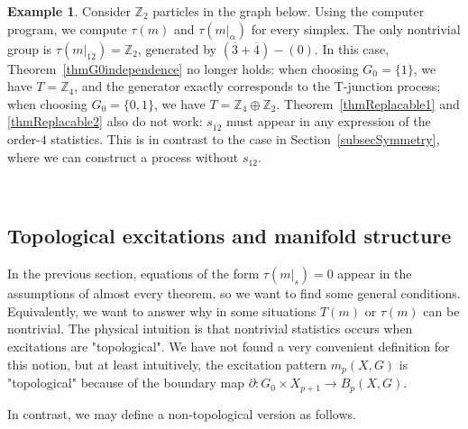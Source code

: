 \documentclass[reprint, amsmath, amssymb, showpacs, floatfix, longbibliography, aps, twocolumn, superscriptaddress, nofootinbib]{revtex4-2}
\newcommand{\ZZ}{{\mathbb Z}}
\theoremstyle{definition}
\newtheorem{example}{Example}[section]
\begin{document}
\begin{example}\label{expNotManifold}
	Consider $\ZZ_2$ particles in the graph below. Using the computer program, we compute $\tau(m)$ and $\tau(m|_\alpha)$ for every simplex. The only nontrivial group is $\tau(m|_{\overline{12}})=\ZZ_2$, generated by $(\overline{3}+\overline{4})-(0)$.  In this case, Theorem~\ref{thmG0independence} no longer holds: when choosing $G_0=\{1\}$, we have $T=\ZZ_4$, and the generator exactly corresponds to the T-junction process; when choosing $G_0=\{0,1\}$, we have $T=\ZZ_4\oplus \ZZ_2$. Theorem~\ref{thmReplacable1} and \ref{thmReplacable2} also do not work: $s_{\overline{12}}$ must appear in any expression of the order-$4$ statistics. This is in contrast to the case in Section~\ref{subsecSymmetry}, where we can construct a process without $s_{\overline{12}}$. 
	
	
	~~~~~~~~~~~~~~~~
	
	
\end{example}

\subsection{Topological excitations and manifold structure}

In the previous section, equations of the form $\tau(m|_s)=0$ appear in the assumptions of almost every theorem, so we want to find some general conditions. Equivalently, we want to answer why in some situations $T(m)$ or $\tau(m)$ can be nontrivial. The physical intuition is that nontrivial statistics occurs when excitations are "topological". We have not found a very convenient definition for this notion, but at least intuitively, the excitation pattern $m_p(X,G)$ is "topological" because of the boundary map $\partial: G_0\times X_{p+1}\rightarrow B_p(X,G)$. 

In contrast, we may define a non-topological version as follows.
\end{document}
